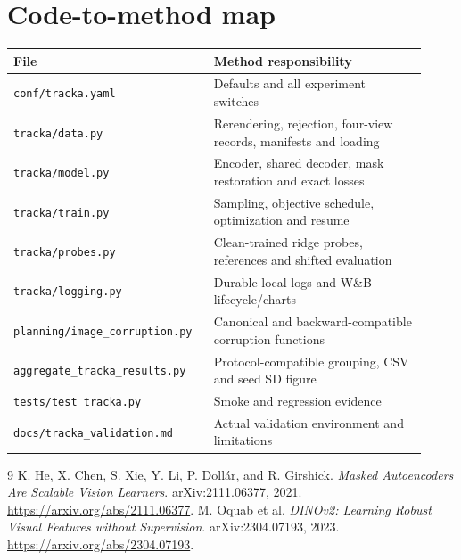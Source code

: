 \documentclass[11pt,a4paper]{article}
\newcommand{\code}[1]{\nolinkurl{#1}}
\begin{document}
\section{Code-to-method map}
\begin{longtable}{p{0.43\linewidth}p{0.49\linewidth}}
\toprule File & Method responsibility \\\midrule\endhead
\code{conf/tracka.yaml} & Defaults and all experiment switches \\
\code{tracka/data.py} & Rerendering, rejection, four-view records, manifests and loading \\
\code{tracka/model.py} & Encoder, shared decoder, mask restoration and exact losses \\
\code{tracka/train.py} & Sampling, objective schedule, optimization and resume \\
\code{tracka/probes.py} & Clean-trained ridge probes, references and shifted evaluation \\
\code{tracka/logging.py} & Durable local logs and W\&B lifecycle/charts \\
\code{planning/image_corruption.py} & Canonical and backward-compatible corruption functions \\
\code{aggregate_tracka_results.py} & Protocol-compatible grouping, CSV and seed SD figure \\
\code{tests/test_tracka.py} & Smoke and regression evidence \\
\code{docs/tracka_validation.md} & Actual validation environment and limitations \\\bottomrule
\end{longtable}

\begin{thebibliography}{9}
 K. He, X. Chen, S. Xie, Y. Li, P. Doll\'ar, and R. Girshick.
\emph{Masked Autoencoders Are Scalable Vision Learners}. arXiv:2111.06377, 2021.
\url{https://arxiv.org/abs/2111.06377}.
 M. Oquab et al.
\emph{DINOv2: Learning Robust Visual Features without Supervision}.
arXiv:2304.07193, 2023.
\url{https://arxiv.org/abs/2304.07193}.
\end{thebibliography}
\end{document}
